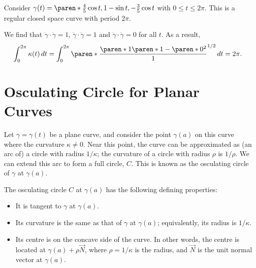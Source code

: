 \documentclass[11pt]{penrose}
\newcommand{\vN}{\vec{N}}
\newcommand{\missing}[1]{{\color{red}#1}}
\newcommand{\keyword}[1]{\textsf{#1}}
\begin{document}
\begin{negg}
    Consider $\gamma(t) = \paren*{ \frac{4}{5} \cos t, 1 - \sin t, -\frac{3}{5} \cos t }$ with $0 \leq t \leq 2\pi$. This is a regular closed space curve with period $2\pi$.

    We find that $\dot{\gamma}\cdot\dot{\gamma} = 1$, $\ddot{\gamma}\cdot\ddot{\gamma} = 1$ and $\dot{\gamma}\cdot\ddot{\gamma} = 0$ for all $t$. As a result,
    \begin{equation}
        \int_0^{2\pi} \kappa(t) \,dt
        = \int_{0}^{2\pi} \paren*{ \frac{ \paren*{1}\paren*{1} - \paren*{0}^2 }{ 1 } }^{1/2} \,dt
        = 2\pi.
    \end{equation}
\end{negg}


\section{Osculating Circle for Planar Curves}
Let $\gamma = \gamma(t)$ be a plane curve, and consider the point $\gamma(a)$ on this curve where the curvature $\kappa \neq 0$. Near this point, the curve can be approximated as (an arc of) a circle with radius $1/\kappa$; the curvature of a circle with radius $\rho$ is $1/\rho$. We can extend this arc to form a full circle, $C$. This is known as the \keyword{osculating circle} of $\gamma$ at $\gamma(a)$.

The osculating circle $C$ at $\gamma(a)$ has the following defining properties:
\begin{itemize}
    \item It is tangent to $\gamma$ at $\gamma(a)$.
    \item Its curvature is the same as that of $\gamma$ at $\gamma(a)$; equivalently, its radius is $1/\kappa$.
    \item Its centre is on the concave side of the curve. In other words, the centre is located at $\gamma(a) + \rho\vN$, where $\rho = 1/\kappa$ is the radius, and $\vN$ is the unit normal vector at $\gamma(a)$.
\end{itemize}
\end{document}
